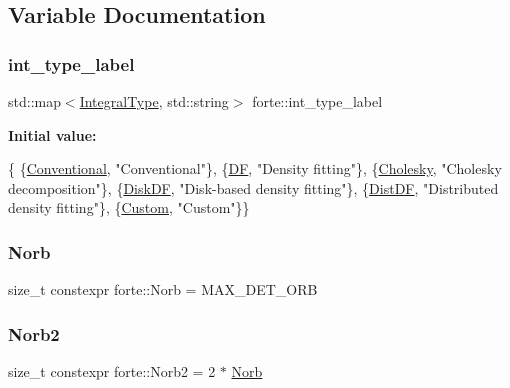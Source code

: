 \subsection{Variable Documentation}
\mbox{\label{namespaceforte_a87090cb003e318d4d0032b7f25f077a0}} 
\subsubsection{\texorpdfstring{int\+\_\+type\+\_\+label}{int\_type\_label}}
{\footnotesize\ttfamily std\+::map$<$\mbox{\hyperlink{namespaceforte_a790e7e85ac0911c4c9494622496d95e6}{Integral\+Type}}, std\+::string$>$ forte\+::int\+\_\+type\+\_\+label}

{\bfseries Initial value\+:}
\begin{DoxyCode}
\{
    \{\mbox{\hyperlink{namespaceforte_a790e7e85ac0911c4c9494622496d95e6af94bb2613e35569ce7e8050363ff45eb}{Conventional}}, \textcolor{stringliteral}{"Conventional"}\},          \{\mbox{\hyperlink{namespaceforte_a790e7e85ac0911c4c9494622496d95e6ab8b5949fb2d3e58becc289fea2b4c750}{DF}}, \textcolor{stringliteral}{"Density fitting"}\},
    \{\mbox{\hyperlink{namespaceforte_a790e7e85ac0911c4c9494622496d95e6a95bcf5261a856e90df642fb085ed9f94}{Cholesky}}, \textcolor{stringliteral}{"Cholesky decomposition"}\},    \{\mbox{\hyperlink{namespaceforte_a790e7e85ac0911c4c9494622496d95e6a4e355b6eb7fda3f59498181a102dac45}{DiskDF}}, \textcolor{stringliteral}{"Disk-based density fitting"}\},
    \{\mbox{\hyperlink{namespaceforte_a790e7e85ac0911c4c9494622496d95e6a094dfed17168b1bf17c1d39490c708dc}{DistDF}}, \textcolor{stringliteral}{"Distributed density fitting"}\}, \{\mbox{\hyperlink{namespaceforte_a790e7e85ac0911c4c9494622496d95e6a5fafd80e1e593e4b4e5b35e6b0cf9dd6}{Custom}}, \textcolor{stringliteral}{"Custom"}\}\}
\end{DoxyCode}
\mbox{\label{namespaceforte_ac7cda07e927e5e88a2c8c754044915e2}} 
\subsubsection{\texorpdfstring{Norb}{Norb}}
{\footnotesize\ttfamily size\+\_\+t constexpr forte\+::\+Norb = M\+A\+X\+\_\+\+D\+E\+T\+\_\+\+O\+RB}

\mbox{\label{namespaceforte_adf4c83dd9e12e4643afac07f1a89e7bb}} 
\subsubsection{\texorpdfstring{Norb2}{Norb2}}
{\footnotesize\ttfamily size\+\_\+t constexpr forte\+::\+Norb2 = 2 $\ast$ \mbox{\hyperlink{namespaceforte_ac7cda07e927e5e88a2c8c754044915e2}{Norb}}}

